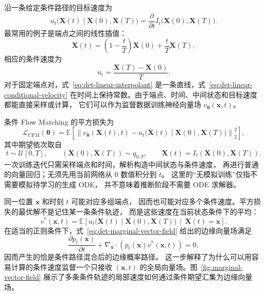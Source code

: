 \documentclass[UTF8,a4paper,zihao=-4,oneside,openany]{ctexbook}
\begin{document}
沿一条给定条件路径的目标速度为
\begin{equation}
    u_t\bigl(
        \mathbf{X}(t)
        \mid\mathbf{X}(0),\mathbf{X}(T)
    \bigr)
    =
    \frac{\partial}{\partial t}
    I_t\bigl(\mathbf{X}(0),\mathbf{X}(T)\bigr).
    \label{eq:det-conditional-velocity}
\end{equation}
最常用的例子是端点之间的线性插值：
\begin{equation}
    \mathbf{X}(t)
    =
    \left(1-\frac{t}{T}\right)\mathbf{X}(0)
    +
    \frac{t}{T}\mathbf{X}(T),
    \label{eq:det-linear-interpolant}
\end{equation}
相应的条件速度为
\begin{equation}
    u_t
    =
    \frac{\mathbf{X}(T)-\mathbf{X}(0)}{T}.
    \label{eq:det-linear-conditional-velocity}
\end{equation}
对于固定端点对，式~\eqref{eq:det-linear-interpolant}
是一条直线，式~\eqref{eq:det-linear-conditional-velocity}
在时间上保持常数。由于端点、时间、中间状态和目标速度都能直接采样或计算，
它们可以作为监督数据训练神经向量场
\(v_{\boldsymbol{\theta}}(\mathbf{x},t)\)。

条件 Flow Matching 的平方损失为
\begin{equation}
    \mathcal{L}_{\mathrm{CFM}}(\boldsymbol{\theta})
    =
    \mathbb{E}
    \left[
        \left\|
            v_{\boldsymbol{\theta}}(\mathbf{X}(t),t)
            -
            u_t\bigl(
                \mathbf{X}(t)
                \mid\mathbf{X}(0),\mathbf{X}(T)
            \bigr)
        \right\|_2^2
    \right],
    \label{eq:det-cfm-loss}
\end{equation}
其中期望依次取自
\[
    t\sim\mathcal{U}[0,T],
    \qquad
    (\mathbf{X}(0),\mathbf{X}(T))\sim q_{0,T},
    \qquad
    \mathbf{X}(t)=I_t(\mathbf{X}(0),\mathbf{X}(T)).
\]
一次训练迭代只需采样端点和时间，解析构造中间状态与条件速度，
再进行普通的向量回归；无须先用当前网络从 \(0\) 数值积分到 \(t\)。
这里的“无模拟训练”仅指不需要模拟待学习的生成 ODE，
并不意味着推断阶段不需要 ODE 求解器。

同一位置 \(\mathbf{x}\) 和时刻 \(t\) 可能对应多组端点，
因而也可能对应多个条件速度。平方损失的最优解不是记住某一条条件轨迹，
而是这些速度在当前状态条件下的平均：
\begin{equation}
    v^{*}(\mathbf{x},t)
    =
    \mathbb{E}
    \left[
        u_t\bigl(
            \mathbf{X}(t)
            \mid\mathbf{X}(0),\mathbf{X}(T)
        \bigr)
        \,\middle|\,
        \mathbf{X}(t)=\mathbf{x}
    \right].
    \label{eq:det-marginal-vector-field}
\end{equation}
在适当的正则条件下，式~\eqref{eq:det-marginal-vector-field}
给出的边缘向量场满足
\begin{equation}
    \frac{\partial p_t(\mathbf{x})}{\partial t}
    +
    \nabla_{\mathbf{x}}\cdot
    \left(
        p_t(\mathbf{x})v^{*}(\mathbf{x},t)
    \right)
    =
    0,
    \label{eq:det-fm-continuity}
\end{equation}
因而产生的恰是条件路径混合后的边缘概率路径。
这一步解释了为什么可以用容易计算的条件速度监督一个只接收
\((\mathbf{x},t)\) 的全局向量场。图~\ref{fig:marginal-vector-field}
展示了多条条件轨迹的局部速度如何通过条件期望汇集为边缘向量场。
\end{document}
